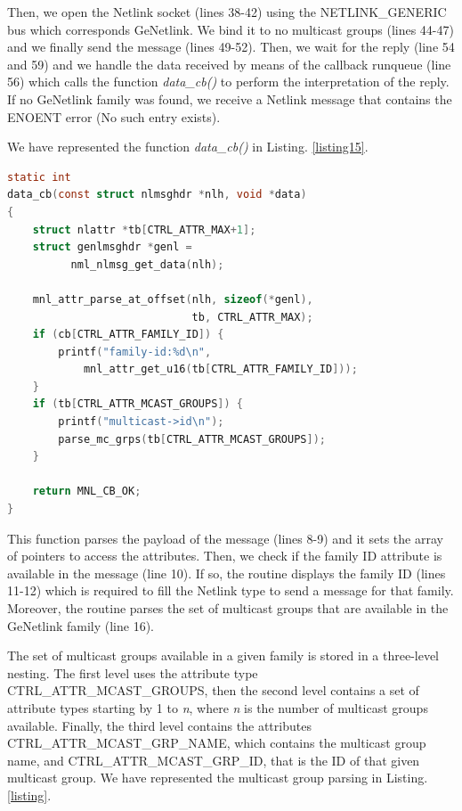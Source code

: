 \documentclass[10pt,onecolumn]{article}
\begin{document}
Then, we open the Netlink socket (lines 38-42) using the NETLINK\_GENERIC bus which corresponds GeNetlink. We bind it to no multicast groups (lines 44-47) and we finally send the message (lines 49-52). Then, we wait for the reply (line 54 and 59) and we handle the data received by means of the callback runqueue (line 56) which calls the function \textit{data\_cb()} to perform the interpretation of the reply. If no GeNetlink family was found, we receive a Netlink message that contains the ENOENT error (No such entry exists).

We have represented the function \textit{data\_cb()} in Listing. \ref{listing15}.

\begin{lstlisting}[language=C, caption=Digesting GeNetlink control messages, label=listing15]
static int
data_cb(const struct nlmsghdr *nlh, void *data)
{
    struct nlattr *tb[CTRL_ATTR_MAX+1];
    struct genlmsghdr *genl = 
          nml_nlmsg_get_data(nlh);

    mnl_attr_parse_at_offset(nlh, sizeof(*genl),
                             tb, CTRL_ATTR_MAX);
    if (cb[CTRL_ATTR_FAMILY_ID]) {
        printf("family-id:%d\n",
            mnl_attr_get_u16(tb[CTRL_ATTR_FAMILY_ID]));
    }
    if (tb[CTRL_ATTR_MCAST_GROUPS]) {
        printf("multicast->id\n");
        parse_mc_grps(tb[CTRL_ATTR_MCAST_GROUPS]);
    }

    return MNL_CB_OK;
}
\end{lstlisting}

This function parses the payload of the message (lines 8-9) and it sets the array of pointers to access the attributes. Then, we check if the family ID attribute is available in the message (line 10). If so, the routine displays the family ID (lines 11-12) which is required to fill the Netlink type to send a message for that family. Moreover, the routine parses the set of multicast groups that are available in the GeNetlink family (line 16).

The set of multicast groups available in a given family is stored in a three-level nesting. The first level uses the attribute type CTRL\_ATTR\_MCAST\_GROUPS, then the second level contains a set of attribute types starting by 1 to \textit{n}, where \textit{n} is the number of multicast groups available. Finally, the third level contains the attributes CTRL\_ATTR\_MCAST\_GRP\_NAME, which contains the multicast group name, and CTRL\_ATTR\_MCAST\_GRP\_ID, that is the ID of that given multicast group. We have represented the multicast group parsing in Listing. \ref{listing}.
\end{document}
